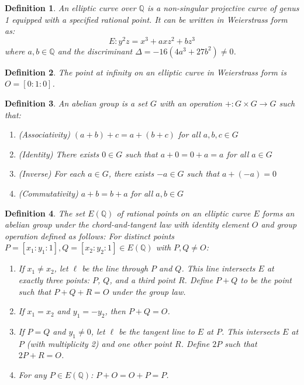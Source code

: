 \documentclass{article}
\newtheorem{definition}{Definition}
\begin{document}
\begin{definition}
  An elliptic curve over $\mathbb{Q}$ is a non-singular projective curve of
  genus 1 equipped with a specified rational point. It can be written in
  Weierstrass form as:
  \[ E : y^2 z = x^3 + axz^2 + bz^3 \]
  where $a, b \in \mathbb{Q}$ and the discriminant $\Delta = - 16 (4 a^3 + 27
  b^2) \neq 0$.
\end{definition}

\begin{definition}
  The point at infinity on an elliptic curve in Weierstrass form is $O = [0 :
  1 : 0]$.
\end{definition}

\begin{definition}
  An abelian group is a set $G$ with an operation $+ : G \times G \to G$ such
  that:
  \begin{enumerate}
    \item (Associativity) $(a + b) + c = a + (b + c)$ for all $a, b, c \in G$
    
    \item (Identity) There exists $0 \in G$ such that $a + 0 = 0 + a = a$ for
    all $a \in G$
    
    \item (Inverse) For each $a \in G$, there exists $- a \in G$ such that $a
    + (- a) = 0$
    
    \item (Commutativity) $a + b = b + a$ for all $a, b \in G$
  \end{enumerate}
\end{definition}

\begin{definition}
  The set $E (\mathbb{Q})$ of rational points on an elliptic curve $E$ forms
  an abelian group under the chord-and-tangent law with identity element $O$
  and group operation defined as follows: For distinct points $P = [x_1 : y_1
  : 1], Q = [x_2 : y_2 : 1] \in E (\mathbb{Q})$ with $P, Q \neq O$:
  \begin{enumerate}
    \item If $x_1 \neq x_2$, let $\ell$ be the line through $P$ and $Q$. This
    line intersects $E$ at exactly three points: $P$, $Q$, and a third point
    $R$. Define $P + Q$ to be the point such that $P + Q + R = O$ under the
    group law.
    
    \item If $x_1 = x_2$ and $y_1 = - y_2$, then $P + Q = O$.
    
    \item If $P = Q$ and $y_1 \neq 0$, let $\ell$ be the tangent line to $E$
    at $P$. This intersects $E$ at $P$ (with multiplicity 2) and one other
    point $R$. Define $2 P$ such that $2 P + R = O$.
    
    \item For any $P \in E (\mathbb{Q})$: $P + O = O + P = P$.
  \end{enumerate}
\end{definition}
\end{document}
